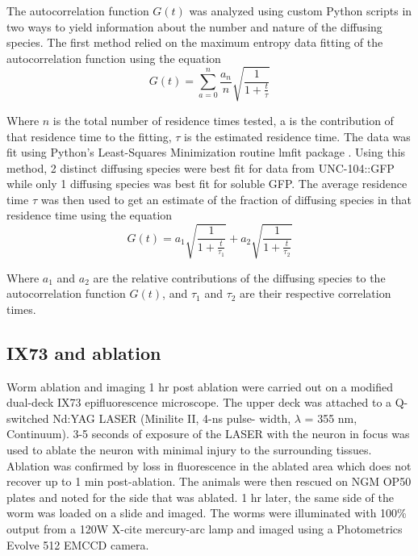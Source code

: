 The autocorrelation function $G(t)$ was analyzed using custom Python scripts in two ways to yield information about the number and nature of the diffusing species. The first method relied on the maximum entropy data fitting of the autocorrelation function using the equation \parencite{sengupta2003}
\begin{equation}
	\label{eqn:autocorrelation}
	G(t) = \sum_{a=0}^{n}\frac{a_{n}}{n}\sqrt{\frac{1}{1+\frac{t}{\tau}}}
\end{equation}

Where $n$ is the total number of residence times tested, a is the contribution of that residence time to the fitting, $\tau$ is the estimated residence time. The data was fit using Python’s Least-Squares Minimization routine lmfit package \parencite{newville2014}. Using this method, 2 distinct diffusing species were best fit for data from UNC-104::GFP while only 1 diffusing species was best fit for soluble GFP. The average residence time $\tau$ was then used to get an estimate of the fraction of diffusing species in that residence time using the equation
\begin{equation}
	\label{eqn:autocorrelationall}
	G(t) = a_1\sqrt{\frac{1}{1+\frac{t}{\tau_1}}} + a_2\sqrt{\frac{1}{1+\frac{t}{\tau_2}}}
\end{equation}

Where $a_1$ and $a_2$ are the relative contributions of the diffusing species to the autocorrelation function $G(t)$, and $\tau_1$ and $\tau_2$ are their respective correlation times.

\subsection{IX73 and ablation}

Worm ablation and imaging 1 hr post ablation were carried out on a modified dual-deck IX73 epifluorescence microscope. The upper deck was attached to a Q-switched Nd:YAG LASER (Minilite II, 4-ns pulse- width, $\lambda$ = 355 nm, Continuum). 3-5 seconds of exposure of the LASER with the neuron in focus was used to ablate the neuron with minimal injury to the surrounding tissues. Ablation was confirmed by loss in fluorescence in the ablated area which does not recover up to 1 min post-ablation. The animals were then rescued on NGM OP50 plates and noted for the side that was ablated. 1 hr later, the same side of the worm was loaded on a slide and imaged. The worms were illuminated with 100\% output from a 120W X-cite mercury-arc lamp and imaged using a Photometrics Evolve 512 EMCCD camera.

